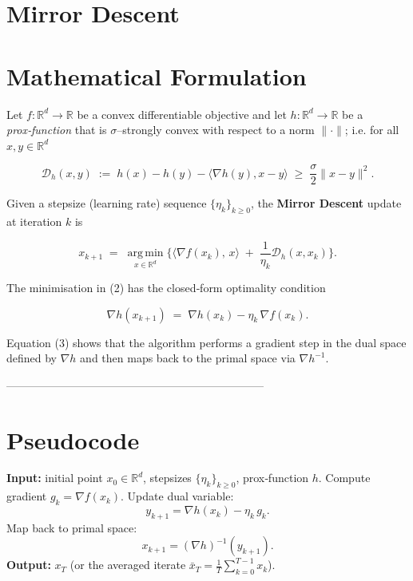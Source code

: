 \documentclass{article}
\newcommand{\argmin}{\operatorname*{arg\,min}}
\newcommand{\D}{\mathcal{D}}
\newcommand{\R}{\mathbb{R}}
\begin{document}
\section*{Mirror Descent}

\section*{Mathematical Formulation}
Let $f:\R^{d}\rightarrow\R$ be a convex differentiable objective and let  
$h:\R^{d}\rightarrow\R$ be a \emph{prox‑function} that is $\sigma$–strongly convex
with respect to a norm $\|\cdot\|$; i.e. for all $x,y\in\R^{d}$

\[
\D_{h}(x,y)\;:=\;h(x)-h(y)-\langle\nabla h(y),x-y\rangle\;\ge\;
\frac{\sigma}{2}\|x-y\|^{2}. \tag{1}
\]

Given a stepsize (learning rate) sequence $\{\eta_{k}\}_{k\ge 0}$,
the \textbf{Mirror Descent} update at iteration $k$ is

\[
x_{k+1}\;=\;\argmin_{x\in\R^{d}}
\Big\{\langle\nabla f(x_{k}),\,x\rangle
\;+\;\frac{1}{\eta_{k}}\D_{h}(x,x_{k})\Big\}. \tag{2}
\]

The minimisation in (2) has the closed‑form optimality condition

\[
\nabla h(x_{k+1}) \;=\; \nabla h(x_{k})-\eta_{k}\,\nabla f(x_{k}). \tag{3}
\]

Equation (3) shows that the algorithm performs a gradient step in the
dual space defined by $\nabla h$ and then maps back to the primal space via
$\nabla h^{-1}$.

---------------------------------------------------------------------

\section*{Pseudocode}
\begin{algorithm}[H]
\caption{Mirror Descent}
\begin{algorithmic}[1]
\STATE \textbf{Input:} initial point $x_{0}\in\R^{d}$, stepsizes $\{\eta_{k}\}_{k\ge0}$, prox‑function $h$.
    \STATE Compute gradient $g_{k}= \nabla f(x_{k})$.
    \STATE Update dual variable:
    \[
    y_{k+1}= \nabla h(x_{k})-\eta_{k}\,g_{k}.
    \]
    \STATE Map back to primal space:
    \[
    x_{k+1}= (\nabla h)^{-1}(y_{k+1}) .
    \]
\ENDFOR
\STATE \textbf{Output:} $x_{T}$ (or the averaged iterate $\bar{x}_{T}= \tfrac1T\sum_{k=0}^{T-1}x_{k}$).
\end{algorithmic}
\end{algorithm}
\end{document}
